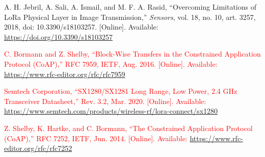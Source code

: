 \documentclass[12pt,a4paper]{article}
\DeclareRobustCommand{\changed}[1]{\textcolor{red}{#1}}
\begin{document}
\begin{enumerate}[label={[\arabic*]}]
    \item A. H. Jebril, A. Sali, A. Ismail, and M. F. A. Rasid, ``Overcoming Limitations of LoRa Physical Layer in Image Transmission,'' \textit{Sensors}, vol. 18, no. 10, art. 3257, 2018, doi: 10.3390/s18103257. [Online]. Available: \url{https://doi.org/10.3390/s18103257}

    \item \changed{C. Bormann and Z. Shelby, ``Block-Wise Transfers in the Constrained Application Protocol (CoAP),'' RFC 7959, IETF, Aug. 2016. [Online]. Available: \url{https://www.rfc-editor.org/rfc/rfc7959}}

    \item \changed{Semtech Corporation, ``SX1280/SX1281 Long Range, Low Power, 2.4 GHz Transceiver Datasheet,'' Rev. 3.2, Mar. 2020. [Online]. Available: \url{https://www.semtech.com/products/wireless-rf/lora-connect/sx1280}}

    \item \changed{Z. Shelby, K. Hartke, and C. Bormann, ``The Constrained Application Protocol (CoAP),'' RFC 7252, IETF, Jun. 2014. [Online]. Available: \url{https://www.rfc-editor.org/rfc/rfc7252}}
\end{enumerate}
\end{document}
